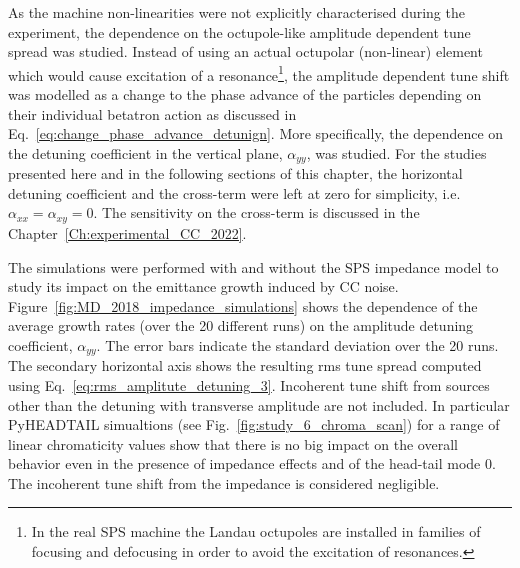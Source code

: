 As the machine non-linearities were not explicitly characterised during the experiment, the dependence on the octupole-like amplitude dependent tune spread was studied. Instead of using an actual octupolar (non-linear) element which would cause excitation of a resonance\footnote{In the real SPS machine the Landau octupoles are installed in families of focusing and defocusing in order to avoid the excitation of resonances.}, the amplitude dependent tune shift was modelled as a change to the phase advance of the particles depending on their individual betatron action as discussed in Eq.~\eqref{eq:change_phase_advance_detunign}. More specifically, the dependence on the detuning coefficient in the vertical plane, $\alpha_{yy}$, was studied. %
For the studies presented here and in the following sections of this chapter, the horizontal detuning coefficient and the cross-term were left at zero for simplicity, i.e.~$\alpha_{xx} = \alpha_{xy} = 0$. %
The sensitivity on the cross-term is discussed in the Chapter~\ref{Ch:experimental_CC_2022}.

The simulations were performed with and without the SPS impedance model to study its impact on the emittance growth induced by CC noise. Figure~\ref{fig:MD_2018_impedance_simulations} shows the dependence of the average growth rates (over the 20 different runs) on the amplitude detuning coefficient, $\alpha_{yy}$. The error bars indicate the standard deviation over the 20 runs. The secondary horizontal axis shows the resulting rms tune spread computed using Eq.~\eqref{eq:rms_amplitute_detuning_3}. Incoherent tune shift from sources other than the detuning with transverse amplitude are not included. In particular PyHEADTAIL simualtions (see Fig.~\ref{fig:study_6_chroma_scan}) for a range of linear chromaticity values show that there is no big impact on the overall behavior even in the presence of impedance effects and of the head-tail mode 0. The incoherent tune shift from the impedance is considered negligible. 


